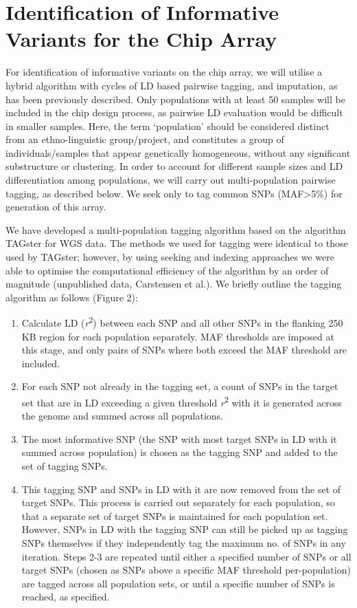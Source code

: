 \section{Identification of Informative Variants for the Chip Array}

For identification of informative variants on the chip array, we will utilise a hybrid algorithm with cycles of LD based pairwise tagging, and imputation, as has been previously described.\cite{} Only populations with at least 50 samples will be included in the chip design process, as pairwise LD evaluation would be difficult in smaller samples. Here, the term ‘population’ should be considered distinct from an ethno-linguistic group/project, and constitutes a group of individuals/samples that appear genetically homogeneous, without any significant substructure or clustering. In order to account for different sample sizes and LD differentiation among populations, we will carry out multi-population pairwise tagging, as described below. We seek only to tag common SNPs (MAF\textgreater5\%) for generation of this array.

We have developed a multi-population tagging algorithm based on the algorithm TAGster for WGS data.\cite{Xu2007} The methods we used for tagging were identical to those used by TAGster; however, by using seeking and indexing approaches we were able to optimise the computational efficiency of the algorithm by an order of magnitude (unpublished data, Carstensen et al.). We briefly outline the tagging algorithm as follows (Figure 2):

\begin{enumerate}
\item Calculate LD (\textit{r}\textsuperscript{2}) between each SNP and all other SNPs in the flanking 250 KB region for each population separately. MAF thresholds are imposed at this stage, and only pairs of SNPs where both exceed the MAF threshold are included.
\item For each SNP not already in the tagging set, a count of SNPs in the target set that are in LD exceeding a given threshold \textit{r}\textsuperscript{2} with it is generated across the genome and summed across all populations.
\item The most informative SNP (the SNP with most target SNPs in LD with it summed across population) is chosen as the tagging SNP and added to the set of tagging SNPs.
\item This tagging SNP and SNPs in LD with it are now removed from the set of target SNPs. This process is carried out separately for each population, so that a separate set of target SNPs is maintained for each population set. However, SNPs in LD with the tagging SNP can still be picked up as tagging SNPs themselves if they independently tag the maximum no. of SNPs in any iteration.
Steps 2-3 are repeated until either a specified number of SNPs or all target SNPs (chosen as SNPs above a specific MAF threshold per-population) are tagged across all population sets, or until a specific number of SNPs is reached, as specified.
\end{enumerate}

